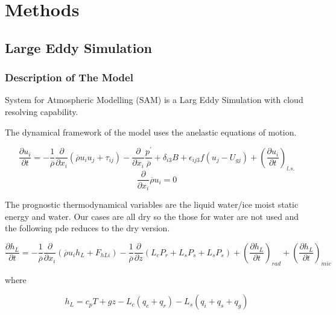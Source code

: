 
\chapter{Methods}
\label{ch:methods}

\section{Large Eddy Simulation}
\label{sec:LargeEddieSimulation}
\subsection{Description of The Model}
System for Atmospheric Modelling (SAM) is a Larg Eddy Simulation with cloud resolving capability.

The dynamical framework of the model uses the anelastic equations of motion.

\begin{equation}
\frac{\partial u_{i}}{\partial t} = -\frac{1}{\overline{\rho}}\frac{\partial}{\partial x_{i}}(\overline{\rho}u_{i}u_{j} + \tau_{ij}) - \frac{\partial}{\partial x_{i}}\frac{p^{'}}{\overline{\rho}} + \delta_{i3}B + \epsilon_{ij3}f(u_{j} - U_{gj}) + \left( \frac{\partial u_{i}}{\partial t} \right)_{l.s.}
\end{equation}
\begin{equation}
\frac{\partial}{\partial x_{i}}\overline{\rho}u_{i}=0
\end{equation}

The prognostic thermodynamical variables are the liquid water/ice moist static energy and water.  Our cases are all dry so the
those for water are not used and the following pde reduces to the dry version.

\begin{equation}
\frac{\partial h_{L}}{\partial t} = -\frac{1}{\overline{\rho}}\frac{\partial}{\partial x_{i}}(\overline{\rho} u_{i}h_{L} + F_{hLi}) - \frac{1}{\overline{\rho}}\frac{\partial}{\partial z}(L_{c}P_{r} + L_{s}P_{s} + L_{s}P_{s}) + \left( \frac{\partial h_{L}}{\partial t} \right)_{rad} + \left( \frac{\partial h_{L}}{\partial t} \right)_{mic}
\end{equation}

where

\begin{equation}
h_{L} = c_{p}T + gz - L_{c}(q_{c} + q_{r}) - L_{s}(q_{i} + q_{s} + q_{g})
\end{equation}

